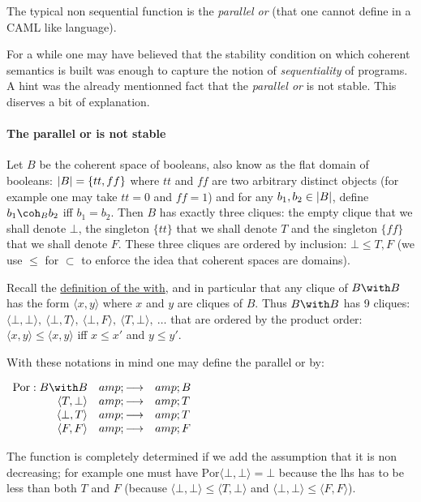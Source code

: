The typical non sequential function is the \emph{parallel or} (that one
cannot define in a CAML like language).

For a while one may have believed that the stability condition on which
coherent semantics is built was enough to capture the notion of
\emph{sequentiality} of programs. A hint was the already mentionned fact
that the \emph{parallel or} is not stable. This diserves a bit of
explanation.

\paragraph{The parallel or is not
stable}\label{the-parallel-or-is-not-stable}

Let \(B\) be the coherent space of booleans, also know as the flat
domain of booleans: \(\left|B\right| = \{tt, ff\}\) where \(tt\) and \(ff\) are
two arbitrary distinct objects (for example one may take \(tt = 0\) and
\(ff = 1\)) and for any \(b_1, b_2\in \left|B\right|\), define \(b_1\coh_B b_2\)
iff \(b_1 = b_2\). Then \(B\) has exactly three cliques: the empty
clique that we shall denote \(\bot\), the singleton \(\{tt\}\) that we
shall denote \(T\) and the singleton \(\{ff\}\) that we shall denote
\(F\). These three cliques are ordered by inclusion: \(\bot \leq T, F\)
(we use \(\leq\) for \(\subset\) to enforce the idea that coherent
spaces are domains).

Recall the \protect\hyperlink{Cartesian_product}{definition of the
with}, and in particular that any clique of \(B\with B\) has the form
\(\langle x, y\rangle\) where \(x\) and \(y\) are cliques of \(B\). Thus
\(B\with B\) has 9 cliques:
\(\langle\bot,\bot\rangle,\ \langle\bot, T\rangle,\ \langle\bot, F\rangle,\ \langle T,\bot\rangle,\ \dots\)
that are ordered by the product order:
\(\langle x,y\rangle\leq \langle x,y\rangle\) iff \(x\leq x'\) and
\(y\leq y'\).

With these notations in mind one may define the parallel or by:

\(\begin{array}{rcl}
\mathrm{Por} : B\with B &amp;\longrightarrow&amp; B\\
  \langle T,\bot\rangle &amp;\longrightarrow&amp; T\\
  \langle \bot,T\rangle &amp;\longrightarrow&amp; T\\
    \langle F, F\rangle &amp;\longrightarrow&amp; F
\end{array}\)

The function is completely determined if we add the assumption that it
is non decreasing; for example one must have
\(\mathrm{Por}\langle\bot,\bot\rangle = \bot\) because the lhs has to be
less than both \(T\) and \(F\) (because
\(\langle\bot,\bot\rangle \leq \langle T,\bot\rangle\) and
\(\langle\bot,\bot\rangle \leq \langle F,F\rangle\)).

